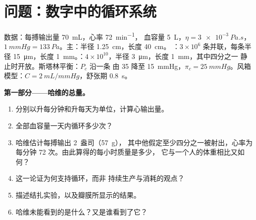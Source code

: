 \section{问题：数字中的循环系统}

\begin{problem}
\label{pb:b2:blood-circulation:1}
数据：每搏输出量 \qty{70}{mL}，心率 \qty{72}{min^{-1}}，
血容量 \qty{5}{L}，$\eta = \qty{3e-3}{Pa.s}$，$\qty{1}{mmHg} =
\qty{133}{Pa}$。主：半径 \qty{1.25}{cm}，长度 \qty{40}{cm}。
：$3\times 10^{6}$ 条并联，每条半径
\qty{15}{\micro m}，长度 \qty{1}{mm}。：$4\times
10^{10}$，半径 \qty{3}{\micro m}，长度 \qty{1}{mm}，其中四分之一
静止时开放。斯塔林平衡：$P_c$ 沿一条
由 35 降至 \qty{15}{mmHg}，$\pi_c = \qty{25}{mmHg}$。风箱模型：$C =
\qty{2}{mL/mmHg}$，舒张期 \qty{0.8}{s}。

\medskip
\noindent\textbf{第一部分——哈维的总量。}
\begin{enumerate}
  \item 分别以升每分钟和升每天为单位，计算心输出量。
  \item 全部血容量一天内循环多少次？
  \item 哈维估计每搏输出 2~盎司（\qty{57}{g}），
        其中他假定至少四分之一被射出，心率为每分钟 72
        次。由此算得的每小时质量是多少，
        它与一个人的体重相比又如何？
  \item 这一论证为何支持循环，而非
        持续生产与消耗的观点？
  \item 描述结扎实验，以及瓣膜所显示的结果。
  \item 哈维未能看到的是什么？又是谁看到了它？
\end{enumerate}


\end{problem}
